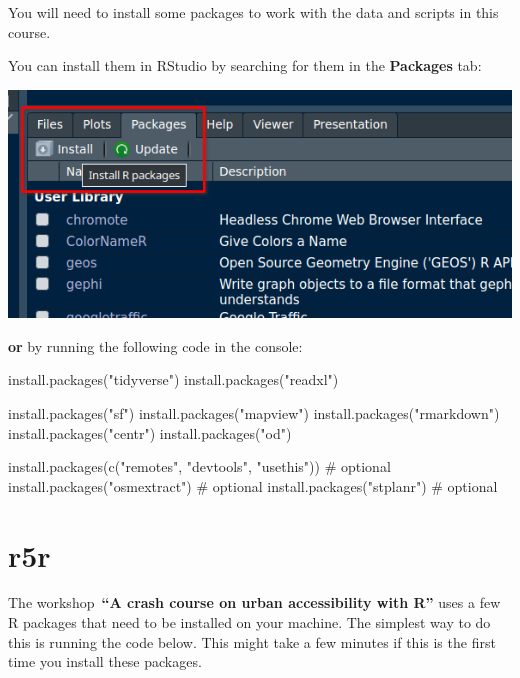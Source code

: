 \documentclass[
  letterpaper,
  DIV=11,
  numbers=noendperiod]{scrreprt}
\newenvironment{Shaded}{\begin{snugshade}}{\end{snugshade}}
\newcommand{\CommentTok}[1]{\textcolor[rgb]{0.37,0.37,0.37}{#1}}
\newcommand{\FunctionTok}[1]{\textcolor[rgb]{0.28,0.35,0.67}{#1}}
\newcommand{\NormalTok}[1]{\textcolor[rgb]{0.00,0.23,0.31}{#1}}
\newcommand{\StringTok}[1]{\textcolor[rgb]{0.13,0.47,0.30}{#1}}
\begin{document}
You will need to install some packages to work with the data and scripts
in this course.

You can install them in RStudio by searching for them in the
\textbf{Packages} tab:

\includegraphics{images/clipboard-3443685728.png}

\textbf{or} by running the following code in the console:

\begin{Shaded}
\begin{Highlighting}[]
\FunctionTok{install.packages}\NormalTok{(}\StringTok{"tidyverse"}\NormalTok{)}
\FunctionTok{install.packages}\NormalTok{(}\StringTok{"readxl"}\NormalTok{)}

\FunctionTok{install.packages}\NormalTok{(}\StringTok{"sf"}\NormalTok{)}
\FunctionTok{install.packages}\NormalTok{(}\StringTok{"mapview"}\NormalTok{)}
\FunctionTok{install.packages}\NormalTok{(}\StringTok{"rmarkdown"}\NormalTok{)}
\FunctionTok{install.packages}\NormalTok{(}\StringTok{"centr"}\NormalTok{)}
\FunctionTok{install.packages}\NormalTok{(}\StringTok{"od"}\NormalTok{)}

\FunctionTok{install.packages}\NormalTok{(}\FunctionTok{c}\NormalTok{(}\StringTok{"remotes"}\NormalTok{, }\StringTok{"devtools"}\NormalTok{, }\StringTok{"usethis"}\NormalTok{)) }\CommentTok{\# optional}
\FunctionTok{install.packages}\NormalTok{(}\StringTok{"osmextract"}\NormalTok{) }\CommentTok{\# optional}
\FunctionTok{install.packages}\NormalTok{(}\StringTok{"stplanr"}\NormalTok{) }\CommentTok{\# optional}
\end{Highlighting}
\end{Shaded}

\section{r5r}\label{r5r}

The workshop~\textbf{``A crash course on urban accessibility with R''}
uses a few R packages that need to be installed on your machine. The
simplest way to do this is running the code below. This might take a few
minutes if this is the first time you install these packages.
\end{document}
